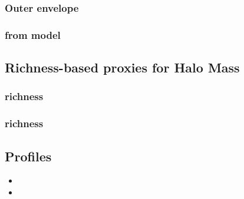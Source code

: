 \documentclass[a4paper,fleqn,usenatbib]{mnras}
\begin{document}
\subsubsection{Outer envelope \mstar{}}
	\label{sec:menvelope}

\subsubsection{\mvir{} from \asap{} model}
	\label{sec:masap}

\subsection{Richness-based proxies for Halo Mass}
	\label{sec:proxy_richness}


\subsubsection{\redm{} richness}
	\label{sec:redmapper}

\subsubsection{\camira{} richness}
	\label{sec:camira}

\subsection{\dsigma{} Profiles}
    \label{sec:dsigma}   
    
    
    	\begin{itemize}
		
		\item {}
		
		\item {}
		
	\end{itemize}    
       
\end{document}

